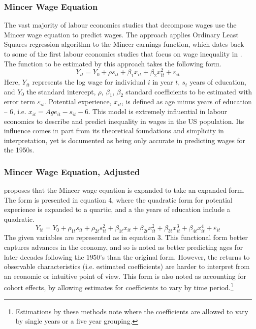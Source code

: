 \documentclass[notitlepage,12pt]{article}
\begin{document}
\subsubsection{Mincer Wage Equation}
The vast majority of labour economics studies that decompose wages use the Mincer wage equation to predict wages.  The approach applies Ordinary Least Squares regression algorithm to the Mincer earnings function, which dates back to some of the first labour economics studies that focus on wage inequality in \cite{mincer1958investment, mincer1974schooling}.  The function to be estimated by this approach takes the following form.
\begin{equation}
Y_{it}  = Y_0 + \rho s_{it} +\beta_1 x_{it} + \beta_2 x_{it}^2 + \varepsilon_{it}
\end{equation}
Here, $Y_{it}$ represents the log wage for individual $i$ in year $t$, $s_i$ years of education, and $Y_0$ the standard intercept, $\rho$, $\beta_1$, $\beta_2$ standard coefficients to be estimated with error term $\varepsilon_{it}$.  Potential experience, $x_{it}$, is defined as age minus years of education -- 6, i.e. $x_{it} = Age_{it} - s_{it} - 6$.  This model is extremely influential in labour economics to describe and predict inequality in wages in the US population.  Its influence comes in part from its theoretical foundations and simplicity in interpretation, yet is documented as being only accurate in predicting wages for the 1950s. 

\subsubsection{Mincer Wage Equation, Adjusted}
\cite{lemieux2006mincer} proposes that the Mincer wage equation is expanded to take an expanded form.  The form is presented in equation 4, where the quadratic form for potential experience is expanded to a quartic, and a the years of education include a quadratic. 
\begin{equation}
Y_{it}  = Y_0 + \rho_{1t} s_{it} + \rho_{2t} s_{it}^2 + \beta_{1t} x_{it} + \beta_{2t} x_{it}^2 + \beta_{3t} x_{it}^3 + \beta_{4t} x_{it}^4 + \varepsilon_{it}
\end{equation}
The given variables are represented as in equation 3.  This functional form better captures advances in the economy, and so is noted as better predicting ages for later decades following the 1950's than the original form.  However, the returns to observable characteristics (i.e. estimated coefficients) are harder to interpret from an economic or intuitive point of view.  This form is also noted as accounting for cohort effects, by allowing estimates for coefficients to vary by time period.\footnote{Estimations by these methods note where the coefficients are allowed to vary by single years or a five year grouping.}
\end{document}
